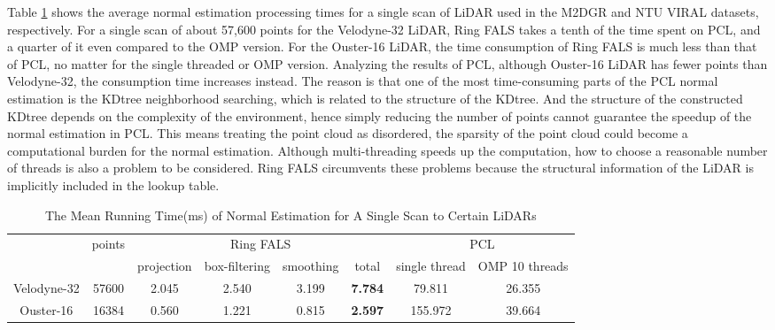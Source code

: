 \documentclass[letterpaper, 10 pt, conference]{ieeeconf}  %
\begin{document}
Table \ref{tab_ringfals_time} shows the average normal estimation processing times for a single scan of LiDAR used in the M2DGR and NTU VIRAL datasets, respectively.
For a single scan of about 57,600 points for the Velodyne-32 LiDAR, Ring FALS takes a tenth of the time spent on PCL, and a quarter of it even compared to the OMP version.
For the Ouster-16 LiDAR, the time consumption of Ring FALS is much less than that of PCL, no matter for the single threaded or OMP version.
Analyzing the results of PCL, although Ouster-16 LiDAR has fewer points than Velodyne-32, the consumption time increases instead.
The reason is that one of the most time-consuming parts of the PCL normal estimation is the KDtree neighborhood searching, which is related to the structure of the KDtree.
And the structure of the constructed KDtree depends on the complexity of the environment, hence simply reducing the number of points cannot guarantee the speedup of the normal estimation in PCL.
This means treating the point cloud as disordered, the sparsity of the point cloud could become a computational burden for the normal estimation.
Although multi-threading speeds up the computation, how to choose a reasonable number of threads is also a problem to be considered.
Ring FALS circumvents these problems because the structural information of the LiDAR is implicitly included in the lookup table.
\begin{table}[htb!]
        \caption{The Mean Running Time(ms) of Normal Estimation for A Single Scan to Certain LiDARs}
        \centering
        \begin{tabular}{c|c|c c c|c|c|c}
                \toprule
                            & \multirow{2}{*}{points} & \multicolumn{4}{c|}{Ring FALS} & \multicolumn{2}{c}{PCL}                                                               \\
                            &                         & projection                     & box-filtering           & smoothing & total          & single thread & OMP 10 threads \\
                \midrule
                Velodyne-32 & 57600                   & 2.045                          & 2.540                   & 3.199     & \textbf{7.784} & 79.811        & 26.355         \\
                Ouster-16   & 16384                   & 0.560                          & 1.221                   & 0.815     & \textbf{2.597} & 155.972       & 39.664         \\
                \bottomrule
        \end{tabular}
        \label{tab_ringfals_time}
\end{table}
\end{document}
